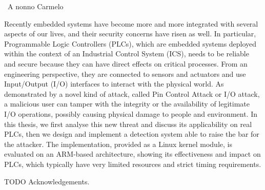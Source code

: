 \documentclass[pdfa,cucitura]{toptesi}
\begin{document}

\TesiDiLaurea{}










\frontespizio
\paginavuota
\newpage

\advance\voffset -5mm
\advance\textheight 30mm


\begin{dedica}
\textdagger\ A nonno Carmelo
\end{dedica}


\sommario

Recently embedded systems have become more and more integrated with several aspects of our lives, and their security concerns have risen as well.
In particular, Programmable Logic Controllers (PLCs), which are embedded systems deployed within the context of an Industrial Control System (ICS),
needs to be reliable and secure because they can have direct effects on critical processes.
From an engineering perspective, they are connected to sensors and actuators and use Input/Output (I/O) interfaces to interact with the physical world.
As demonstrated by a novel kind of attack, called Pin Control Attack or I/O attack, a malicious user can tamper with the integrity or
the availability of legitimate I/O operations, possibly causing physical damage to people and environment.
In this thesis, we first analyse this new threat and discuss its applicability on real PLCs, then we design and implement a detection system able to raise the bar for the attacker.
The implementation, provided as a Linux kernel module, is evaluated on an ARM-based architecture,
showing its effectiveness and impact on PLCs, which typically have very limited resources and strict timing requirements.


\ringraziamenti

TODO Acknowledgements.
\end{document}
